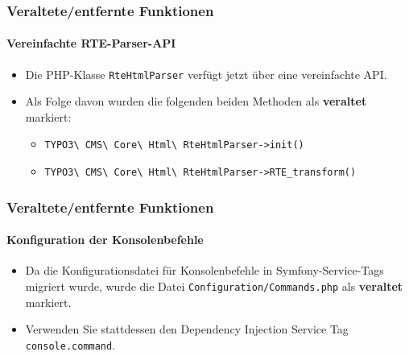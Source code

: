 
\begin{frame}[fragile]
	\frametitle{Veraltete/entfernte Funktionen}
	\framesubtitle{Vereinfachte RTE-Parser-API}

	\begin{itemize}
		\item Die PHP-Klasse \texttt{RteHtmlParser} verfügt jetzt über eine vereinfachte API.
		\item Als Folge davon wurden die folgenden beiden Methoden als \textbf{veraltet} markiert:

			\begin{itemize}
				\item \texttt{TYPO3\textbackslash
					CMS\textbackslash
					Core\textbackslash
					Html\textbackslash
					RteHtmlParser->init()}
				\item \texttt{TYPO3\textbackslash
					CMS\textbackslash
					Core\textbackslash
					Html\textbackslash
					RteHtmlParser->RTE\_transform()}
			\end{itemize}

	\end{itemize}

\end{frame}


\begin{frame}[fragile]
	\frametitle{Veraltete/entfernte Funktionen}
	\framesubtitle{Konfiguration der Konsolenbefehle}

	\begin{itemize}
		\item Da die Konfigurationsdatei für Konsolenbefehle in Symfony-Service-Tags migriert wurde,
			wurde die Datei \texttt{Configuration/Commands.php}
			als \textbf{veraltet} markiert.
		\item Verwenden Sie stattdessen den Dependency Injection Service Tag \texttt{console.command}.

	\end{itemize}

\end{frame}


